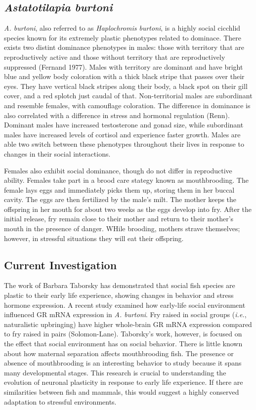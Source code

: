 \documentclass[12pt,twoside]{reedthesis}
\begin{document}
\subsection{\textit{Astatotilapia burtoni}}
 \textit{A. burtoni}, also referred to as \textit{Haplochromis burtoni}, is a
 highly social cicchlid species known for its extremely plastic phenotypes related to
 dominace. There exists two distint dominance phenotypes in males:
those with territory that are reproductively active and those without territory
that are reproductively suppressed (Fernand 1977). Males with
territory are dominant and have bright blue and yellow body coloration with a thick black
stripe that passes over their eyes. They have vertical black stripes along their
body, a black spot on their gill cover, and a red splotch just caudal of that.
Non-territorial males are subordinant and resemble females, with camouflage coloration.
The difference in dominance is also correlated with a difference in stress and
hormonal regulation (Renn). Dominant males have increased testosterone and gonad
size, while subordinant males have increased levels of
cortisol and experience faster growth. Males are
able two switch between these phenotypes throughout their lives in response to
changes in their social interactions.
 

Females also exhibit social dominance, though do not differ in reproductive
ability. Females take part in a brood care stategy known as mouthbrooding. The female lays eggs and immediately picks them up, storing them in
her buccal cavity. The eggs are then fertilized by the male's milt. The
mother keeps the offspring in her mouth for about two weeks as the eggs
develop into fry. After the initial release, fry remain close to their mother
and return to their mother's mouth in the presence of danger. WHile brooding,
mothers strave themselves; however, in stressful situations they will eat their offspring. 


\subsection{Current Investigation}
 
The work of Barbara Taborsky has demonstrated that social fish species are
plastic to their early life experience, showing changes in behavior and stress
hormone expression. A recent study examined how early-life social environment
influenced GR mRNA expression in \textit{A. burtoni}. Fry raised
in social groups (\textit{i.e.}, naturalistic upbringing) have higher
whole-brain GR mRNA expression compared to fry raised in pairs (Solomon-Lane). 
Taborsky's work, however, is focused on the effect that social
environment has on social behavior. There is little known about how maternal
separation affects mouthbrooding fish. The presence or absence of mouthbrooding is an interesting behavior to study because it spans many developmental
stages. This research is crucial to
understanding the evolution of neuronal plasticity in response to early life
experience. If there are similarities between fish and mammals, this would
suggest a highly conserved adaptation to stressful environments.
\end{document}
